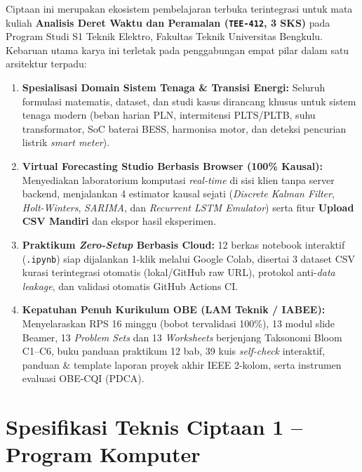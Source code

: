 \documentclass[11pt,a4paper]{article}
\begin{document}
Ciptaan ini merupakan ekosistem pembelajaran terbuka terintegrasi untuk mata kuliah \textbf{Analisis Deret Waktu dan Peramalan (\texttt{TEE-412}, 3 SKS)} pada Program Studi S1 Teknik Elektro, Fakultas Teknik Universitas Bengkulu. Kebaruan utama karya ini terletak pada penggabungan empat pilar dalam satu arsitektur terpadu:
\begin{enumerate}[label=\textbf{\arabic*.}, leftmargin=1.5em, itemsep=3pt]
    \item \textbf{Spesialisasi Domain Sistem Tenaga \& Transisi Energi:} Seluruh formulasi matematis, dataset, dan studi kasus dirancang khusus untuk sistem tenaga modern (beban harian PLN, intermitensi PLTS/PLTB, suhu transformator, SoC baterai BESS, harmonisa motor, dan deteksi pencurian listrik \textit{smart meter}).
    \item \textbf{Virtual Forecasting Studio Berbasis Browser (100\% Kausal):} Menyediakan laboratorium komputasi \textit{real-time} di sisi klien tanpa server backend, menjalankan 4 estimator kausal sejati (\textit{Discrete Kalman Filter}, \textit{Holt-Winters}, \textit{SARIMA}, dan \textit{Recurrent LSTM Emulator}) serta fitur \textbf{Upload CSV Mandiri} dan ekspor hasil eksperimen.
    \item \textbf{Praktikum \textit{Zero-Setup} Berbasis Cloud:} 12 berkas notebook interaktif (\texttt{.ipynb}) siap dijalankan 1-klik melalui Google Colab, disertai 3 dataset CSV kurasi terintegrasi otomatis (lokal/GitHub raw URL), protokol anti-\textit{data leakage}, dan validasi otomatis GitHub Actions CI.
    \item \textbf{Kepatuhan Penuh Kurikulum OBE (LAM Teknik / IABEE):} Menyelaraskan RPS 16 minggu (bobot tervalidasi 100\%), 13 modul slide Beamer, 13 \textit{Problem Sets} dan 13 \textit{Worksheets} berjenjang Taksonomi Bloom C1--C6, buku panduan praktikum 12 bab, 39 kuis \textit{self-check} interaktif, panduan \& template laporan proyek akhir IEEE 2-kolom, serta instrumen evaluasi OBE-CQI (PDCA).
\end{enumerate}

\section{Spesifikasi Teknis Ciptaan 1 -- Program Komputer}
\end{document}
